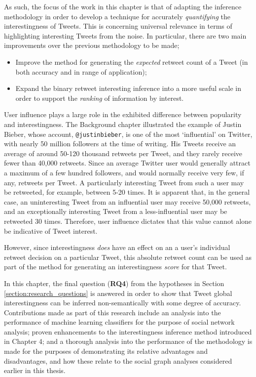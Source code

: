 As such, the focus of the work in this chapter is that of adapting the inference methodology in order to develop a technique for accurately \textit{quantifying} the interestingness of Tweets. This is concerning universal relevance in terms of highlighting interesting Tweets from the noise. In particular, there are two main improvements over the previous methodology to be made;
\begin{itemize}
    \item Improve the method for generating the \textit{expected} retweet count of a Tweet (in both accuracy and in range of application);
    \item Expand the binary retweet interesting inference into a more useful scale in order to support the \textit{ranking} of information by interest.
\end{itemize}

User influence plays a large role in the exhibited difference between popularity and interestingness. The Background chapter illustrated the example of Justin Bieber, whose account, \texttt{@justinbieber}, is one of the most `influential' on Twitter, with nearly 50 million followers at the time of writing. His Tweets receive an average of around 50-120 thousand retweets per Tweet, and they rarely receive fewer than 40,000 retweets. Since an average Twitter user would generally attract a maximum of a few hundred followers, and would normally receive very few, if any, retweets per Tweet. A particularly interesting Tweet from such a user may be retweeted, for example, between 5-20 times. It is apparent that, in the general case, an uninteresting Tweet from an influential user may receive 50,000 retweets, and an exceptionally interesting Tweet from a less-influential user may be retweeted 30 times. Therefore, user influence dictates that this value cannot alone be indicative of Tweet interest.

However, since interestingness \textit{does} have an effect on an a user's individual retweet decision on a particular Tweet, this absolute retweet count can be used as part of the method for generating an interestingness \textit{score} for that Tweet.

In this chapter, the final question (\textbf{RQ4}) from the hypotheses in Section \ref{section:research_questions} is answered in order to show that Tweet global interestingness can be inferred non-semantically with some degree of accuracy. Contributions made as part of this research include an analysis into the performance of machine learning classifiers for the purpose of social network analysis; proven enhancements to the interestingness inference method introduced in Chapter 4; and a thorough analysis into the performance of the methodology is made for the purposes of demonstrating its relative advantages and disadvantages, and how these relate to the social graph analyses considered earlier in this thesis. 



